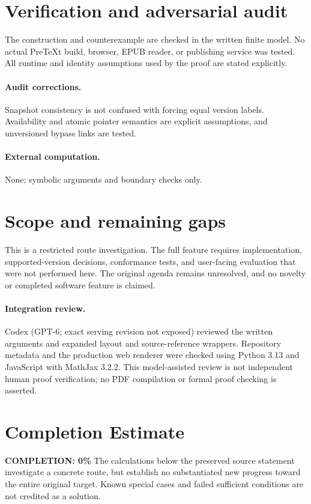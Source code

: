 \documentclass[11pt]{article}
\begin{document}
\section{Verification and adversarial audit}
The construction and counterexample are checked in the written finite model. No actual PreTeXt build, browser, EPUB reader, or publishing service was tested. All runtime and identity assumptions used by the proof are stated explicitly.
\paragraph{Audit corrections.} Snapshot consistency is not confused with forcing equal version labels. Availability and atomic pointer semantics are explicit assumptions, and unversioned bypass links are tested.
\paragraph{External computation.} None; symbolic arguments and boundary checks only.
\section{Scope and remaining gaps}
This is a restricted route investigation. The full feature requires implementation, supported-version decisions, conformance tests, and user-facing evaluation that were not performed here. The original agenda remains unresolved, and no novelty or completed software feature is claimed.
\paragraph{Integration review.} Codex (GPT-6; exact serving revision not exposed) reviewed the written arguments and expanded layout and source-reference wrappers. Repository metadata and the production web renderer were checked using Python 3.13 and JavaScript with MathJax 3.2.2. This model-assisted review is not independent human proof verification; no PDF compilation or formal proof checking is asserted.

\section{Completion Estimate}
\noindent\textbf{COMPLETION: 0\%}
The calculations below the preserved source statement investigate a concrete route,
but establish no substantiated new progress toward the entire original target.
Known special cases and failed sufficient conditions are not credited as a solution.
\end{document}
